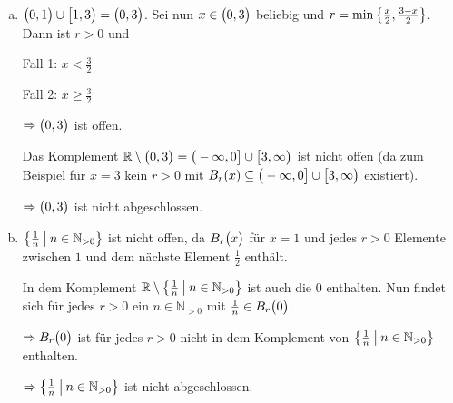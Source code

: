 \documentclass{scrreprt}
\begin{document}
\begin{enumerate}[(a)]
\item $\qty\big(0, 1) \cup {\big [}1, 3 {\big )} = \qty\big(0, 3)$.
  Sei nun $x \in \qty\big(0, 3)$ beliebig und
  $r = \min\qty{\frac{x}{2}, \frac{3 - x}{2}}$.
  Dann ist $r > 0$ und \\
  \begin{minipage}[t]{.4\textwidth}
    Fall 1: $x < \frac{3}{2}$
  \end{minipage}
  \hfill
  \vrule
  \hfill
  \begin{minipage}[t]{.4\textwidth}
    Fall 2: $x \geq \frac{3}{2}$
  \end{minipage}
  $\Rightarrow \qty\big(0, 3)$ ist offen.

  Das Komplement $\mathbb{R} \setminus \qty\big(0, 3) =
  {\big (} -\infty, 0 {\big ]} \cup {\big [} 3, \infty {\big )}$ ist nicht
  offen (da zum Beispiel für $x = 3$ kein $r > 0$ mit $B_r\qty(x) \subseteq
  {\big (} -\infty, 0 {\big ]} \cup {\big [} 3, \infty {\big )}$ existiert).

  $\Rightarrow \qty\big(0, 3)$ ist nicht abgeschlossen.

\item $\qty{\frac{1}{n} \: \middle | \: n \in \mathbb{N}_{>0}}$ ist nicht offen,
  da $B_r\qty\big(x)$ für $x = 1$ und jedes $r > 0$ Elemente zwischen
  $1$ und dem nächste Element $\frac{1}{2}$ enthält.

  In dem Komplement
  $\mathbb{R} \setminus \qty{\frac{1}{n} \: \middle | \: n \in \mathbb{N}_{>0}}$
  ist auch die $0$ enthalten.
  Nun findet sich für jedes $r > 0$ ein $n \in \mathbb{N}_{> 0}$ mit
  $\frac{1}{n} \in B_r\qty\big(0)$.

  $\Rightarrow B_r\qty\big(0)$ ist für jedes $r > 0$ nicht in dem
  Komplement von $\qty{\frac{1}{n} \: \middle | \: n \in \mathbb{N}_{>0}}$
  enthalten.

  $\Rightarrow \qty{\frac{1}{n} \: \middle | \: n \in \mathbb{N}_{>0}}$ ist
  nicht abgeschlossen.


\end{enumerate}
\end{document}
